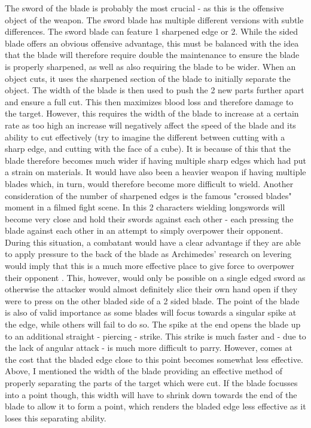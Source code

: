 \documentclass{article}
\begin{document}
The sword of the blade is probably the most crucial - as this is the offensive object of the weapon. The sword blade has multiple different versions with subtle differences. 
The sword blade can feature 1 sharpened edge or 2. While the sided blade offers an obvious offensive advantage, this must be balanced with the idea that the blade will therefore require double the maintenance to ensure the blade is properly sharpened, as well as also requiring the blade to be wider. When an object cuts, it uses the sharpened section of the blade to initially separate the object. The width of the blade is then used to push the 2 new parts further apart and ensure a full cut. This then maximizes blood loss and therefore damage to the target. However, this requires the width of the blade to increase at a certain rate as too high an increase will negatively affect the speed of the blade and its ability to cut effectively (try to imagine the different between cutting with a sharp edge, and cutting with the face of a cube). It is because of this that the blade therefore becomes much wider if having multiple sharp edges which had put a strain on materials. It would have also been a heavier weapon if having multiple blades which, in turn, would therefore become more difficult to wield.
Another consideration of the number of sharpened edges is the famous "crossed blades" moment in a filmed fight scene. In this 2 characters wielding longswords will become very close and hold their swords against each other - each pressing the blade against each other in an attempt to simply overpower their opponent. During this situation, a combatant would have a clear advantage if they are able to apply pressure to the back of the blade as Archimedes' research on levering would imply that this is a much more effective place to give force to overpower their opponent \parencite{bunn2017archimedes}. This, however, would only be possible on a single edged sword as otherwise the attacker would almost definitely slice their own hand open if they were to press on the other bladed side of a 2 sided blade.
\break
The point of the blade is also of valid importance as some blades will focus towards a singular spike at the edge, while others will fail to do so. The spike at the end opens the blade up to an additional straight - piercing - strike. This strike is much faster and - due to the lack of angular attack - is much more difficult to parry. However, comes at the cost that the bladed edge close to this point becomes somewhat less effective. Above, I mentioned the width of the blade providing an effective method of properly separating the parts of the target which were cut. If the blade focusses into a point though, this width will have to shrink down towards the end of the blade to allow it to form a point, which renders the bladed edge less effective as it loses this separating ability.
\end{document}
